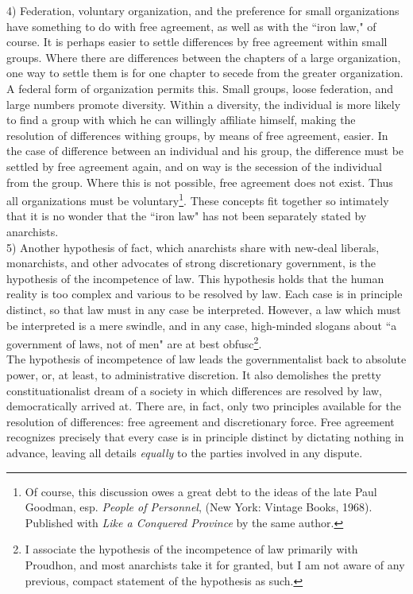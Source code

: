 4) Federation, voluntary organization, and the preference for small organizations have something to do with free agreement, as well as with the ``iron law," of course. It is perhaps easier to settle differences by free agreement within small groups. Where there are differences between the chapters of a large organization, one way to settle them is for one chapter to secede from the greater organization. A federal form of organization permits this. Small groups, loose federation, and large numbers promote diversity. Within a diversity, the individual is more likely to find a group with which he can willingly affiliate himself, making the resolution of differences withing groups, by means of free agreement, easier. In the case of difference between an individual and his group, the difference must be settled by free agreement again, and on way is the secession of the individual from the group. Where this is not possible, free agreement does not exist. Thus all organizations must be voluntary\footnote{Of course, this discussion owes a great debt to the ideas of the late Paul Goodman, esp. \emph{People of Personnel}, (New York: Vintage Books, 1968). Published with \emph{Like a Conquered Province} by the same author.}. These concepts fit together so intimately that it is no wonder that the ``iron law" has not been separately stated by anarchists.\\

5) Another hypothesis of fact, which anarchists share with new-deal liberals, monarchists, and other advocates of strong discretionary government, is the hypothesis of the incompetence of law. This hypothesis holds that the human reality is too complex and various to be resolved by law. Each case is in principle distinct, so that law must in any case be interpreted. However, a law which must be interpreted is a mere swindle, and in any case, high-minded slogans about ``a government of laws, not of men" are at best obfusc\footnote{I associate the hypothesis of the incompetence of law primarily with Proudhon, and most anarchists take it for granted, but I am not aware of any previous, compact statement of the hypothesis as such.}.\\
The hypothesis of incompetence of law leads the governmentalist back to absolute power, or, at least, to administrative discretion. It also demolishes the pretty constituationalist dream of a society in which differences are resolved by law, democratically arrived at. There are, in fact, only two principles available for the resolution of differences: free agreement and discretionary force. Free agreement recognizes precisely that every case is in principle distinct by dictating nothing in advance, leaving all details \emph{equally} to the parties involved in any dispute.\\

